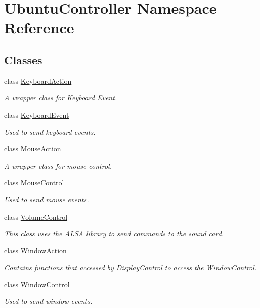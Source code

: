 \hypertarget{namespace_ubuntu_controller}{}\section{Ubuntu\+Controller Namespace Reference}
\label{namespace_ubuntu_controller}
\subsection*{Classes}
\begin{DoxyCompactItemize}
\item 
class \hyperlink{class_ubuntu_controller_1_1_keyboard_action}{Keyboard\+Action}
\begin{DoxyCompactList}\small\item\em A wrapper class for Keyboard Event. \end{DoxyCompactList}\item 
class \hyperlink{class_ubuntu_controller_1_1_keyboard_event}{Keyboard\+Event}
\begin{DoxyCompactList}\small\item\em Used to send keyboard events. \end{DoxyCompactList}\item 
class \hyperlink{class_ubuntu_controller_1_1_mouse_action}{Mouse\+Action}
\begin{DoxyCompactList}\small\item\em A wrapper class for mouse control. \end{DoxyCompactList}\item 
class \hyperlink{class_ubuntu_controller_1_1_mouse_control}{Mouse\+Control}
\begin{DoxyCompactList}\small\item\em Used to send mouse events. \end{DoxyCompactList}\item 
class \hyperlink{class_ubuntu_controller_1_1_volume_control}{Volume\+Control}
\begin{DoxyCompactList}\small\item\em This class uses the A\+L\+SA library to send commands to the sound card. \end{DoxyCompactList}\item 
class \hyperlink{class_ubuntu_controller_1_1_window_action}{Window\+Action}
\begin{DoxyCompactList}\small\item\em Contains functions that accessed by Display\+Control to access the \hyperlink{class_ubuntu_controller_1_1_window_control}{Window\+Control}. \end{DoxyCompactList}\item 
class \hyperlink{class_ubuntu_controller_1_1_window_control}{Window\+Control}
\begin{DoxyCompactList}\small\item\em Used to send window events. \end{DoxyCompactList}\end{DoxyCompactItemize}
